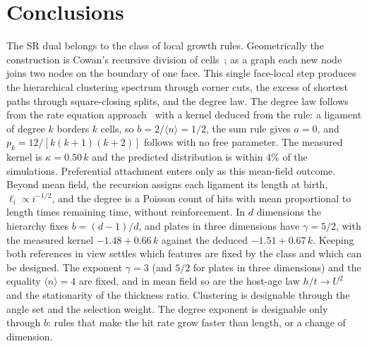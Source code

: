 \documentclass[pre,twocolumn,superscriptaddress,amsmath,amssymb,floatfix]{revtex4-2}
\begin{document}
\section{Conclusions}
\label{sec:conc}

The SR dual belongs to the class of local growth rules. Geometrically the construction
is Cowan's recursive division of cells~\cite{cowan2010}; as a graph each new node joins
two nodes on the boundary of one face. This single face-local step produces the
hierarchical clustering spectrum through corner cuts, the excess of shortest paths
through square-closing splits, and the degree law. The degree law follows from the
rate equation approach~\cite{krapivsky2000} with a kernel deduced from the rule:
a ligament of degree $k$ borders $k$ cells, so $b=2/\langle n\rangle=1/2$, the sum rule
gives $a=0$, and $p_k=12/[k(k+1)(k+2)]$ follows with no free parameter. The measured
kernel is $\kappa=0.50\,k$ and the predicted distribution is within $4\%$ of the
simulations. Preferential attachment enters only as this mean-field outcome. Beyond mean field, the recursion assigns each ligament its length
at birth, $\ell_i\propto i^{-1/2}$, and the degree is a Poisson count of hits with mean
proportional to length times remaining time, without reinforcement. In $d$ dimensions
the hierarchy fixes $b=(d-1)/d$, and plates in three dimensions have $\gamma=5/2$, with
the measured kernel $-1.48+0.66\,k$ against the deduced $-1.51+0.67\,k$. Keeping both references in view settles
which features are fixed by the class and which can be designed. The exponent
$\gamma=3$ (and $5/2$ for plates in three dimensions) and the equality $\langle n\rangle=4$
are fixed, and in mean field so are
the host-age law $h/t\to U^2$ and the stationarity of the thickness ratio. Clustering
is designable through the angle set and the selection weight. The degree exponent is
designable only through $b$: rules that make the hit rate grow faster than length, or a
change of dimension.
\end{document}
